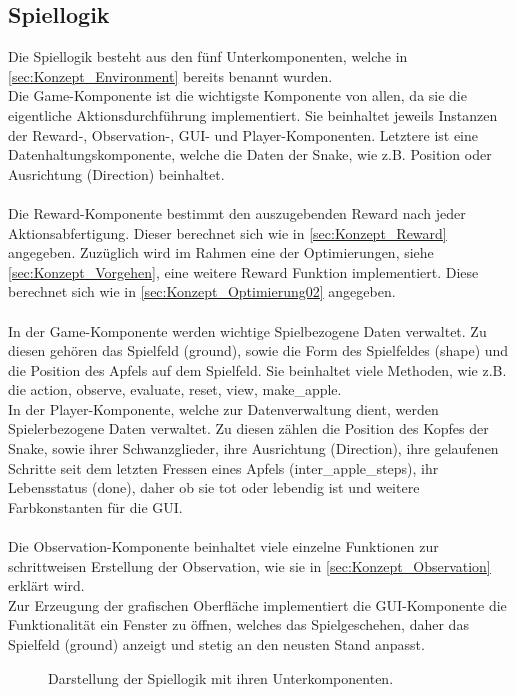 \subsection{Spiellogik} \label{sec:Konzept_Spiellogik}
Die Spiellogik besteht aus den fünf Unterkomponenten, welche in \ref{sec:Konzept_Environment} bereits benannt wurden.\\
Die Game-Komponente ist die wichtigste Komponente von allen, da sie die eigentliche Aktionsdurchführung implementiert. Sie beinhaltet jeweils Instanzen der Reward-, Observation-, GUI- und Player-Komponenten. Letztere ist eine Datenhaltungskomponente, welche die Daten der Snake, wie z.B. Position oder Ausrichtung (Direction) beinhaltet.\\
\\Die Reward-Komponente bestimmt den auszugebenden Reward nach jeder Aktionsabfertigung. Dieser berechnet sich wie in \ref{sec:Konzept_Reward} angegeben. Zuzüglich wird im Rahmen eine der Optimierungen, siehe \ref{sec:Konzept_Vorgehen}, eine weitere Reward Funktion implementiert. Diese berechnet sich wie in \ref{sec:Konzept_Optimierung02} angegeben.\\
\\In der Game-Komponente werden wichtige Spielbezogene Daten verwaltet. Zu diesen gehören das Spielfeld (ground), sowie die Form des Spielfeldes (shape) und die Position des Apfels auf dem Spielfeld. Sie beinhaltet viele Methoden, wie z.B. die action, observe, evaluate, reset, view, make\_apple.
\\In der Player-Komponente, welche zur Datenverwaltung dient, werden Spielerbezogene Daten verwaltet. Zu diesen zählen die Position des Kopfes der Snake, sowie ihrer Schwanzglieder, ihre Ausrichtung (Direction), ihre gelaufenen Schritte seit dem letzten Fressen eines Apfels (inter\_apple\_steps), ihr Lebensstatus (done), daher ob sie tot oder lebendig ist und weitere Farbkonstanten für die GUI.\\
\\Die Observation-Komponente beinhaltet viele einzelne Funktionen zur schrittweisen Erstellung der Observation, wie sie in \ref{sec:Konzept_Observation} erklärt wird.
\\Zur Erzeugung der grafischen Oberfläche implementiert die GUI-Komponente die Funktionalität ein Fenster zu öffnen, welches das Spielgeschehen, daher das Spielfeld (ground) anzeigt und stetig an den neusten Stand anpasst.
\begin{figure}[H]
	\centering
	\def\svgscale{0.17}
	
	\caption[Spiellogik]{Darstellung der Spiellogik mit ihren Unterkomponenten.}
	\label{fig:Spiellogik}
\end{figure}

